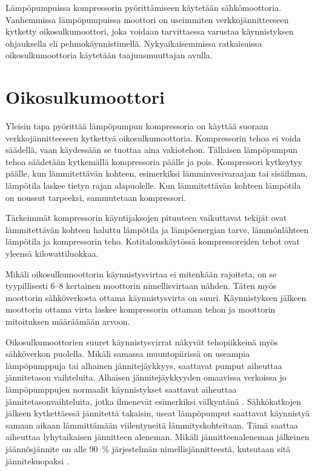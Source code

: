   Lämpöpumpuissa kompressorin pyörittämiseen käytetään sähkömoottoria. Vanhemmissa lämpöpumpuissa moottori on useimmiten verkkojännitteeseen kytketty oikosulkumoottori, joka voidaan tarvittaessa varustaa käynnistyksen ohjauksella eli pehmokäynnistimellä. Nykyaikaisemmissa ratkaisuissa oikosulkumoottoria käytetään taajuusmuuttajan avulla.

\section{Oikosulkumoottori}
  Yleisin tapa pyörittää lämpöpumpun kompressoria on käyttää suoraan verkkojännitteeseen kytkettyä oikosulkumoottoria. Kompressorin tehoa ei voida säädellä, vaan käydessään se tuottaa aina vakiotehon. Tällaisen lämpöpumpun tehoa säädetään kytkemällä kompressoria päälle ja pois. Kompressori kytkeytyy päälle, kun lämmitettävän kohteen, esimerkiksi lämminvesivaraajan tai sisäilman, lämpötila laskee tietyn rajan alapuolelle. Kun lämmitettävän kohteen lämpötila on noussut tarpeeksi, sammutetaan kompressori.

  Tärkeimmät kompressorin käyntijaksojen pituuteen vaikuttavat tekijät ovat lämmitettävän kohteen haluttu lämpötila ja lämpöenergian tarve, lämmönlähteen lämpötila ja kompressorin teho. Kotitalouskäytössä kompressoreiden tehot ovat yleensä kilowattiluokkaa.

  Mikäli oikosulkumoottorin käynnistysvirtaa ei mitenkään rajoiteta, on se tyypillisesti 6--8 kertainen moottorin nimellisvirtaan nähden. Täten myös moottorin sähköverkosta ottama käynnistysvirta on suuri. \parencite{pehmokaynnistinopas} Käynnistyksen jälkeen moottorin ottama virta laskee kompressorin ottaman tehon ja moottorin mitoituksen määräämään arvoon.

  Oikosulkumoottorien suuret käynnistysvirrat näkyvät tehopiikkeinä myös sähköverkon puolella. Mikäli samassa muuntopiirissä on useampia lämpöpumppuja tai alhainen jännitejäykkyys, saattavat pumput aiheuttaa jännitetason vaihteluita. Alhaisen jännitejäykkyyden omaavissa verkoissa jo lämpöpumppujen normaalit käynnistykset saattavat aiheuttaa jännitetasonvaihteluita, jotka ilmenevät esimerkiksi välkyntänä \parencite{SFSEN50160}. Sähkökatkojen jälkeen kytkettäessä jännitettä takaisin, useat lämpöpumput saattavat käynnistyä samaan aikaan lämmittämään viilentyneitä lämmityskohteitaan. Tämä saattaa aiheuttaa lyhytaikaisen jännitteen aleneman. Mikäli jännitteenaleneman jälkeinen jäännösjännite on alle \SI{90}{\percent} järjestelmän nimellisjännitteestä, kutsutaan sitä jännitekuopaksi \parencite{SFSEN50160}.

